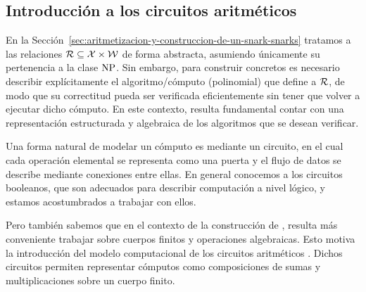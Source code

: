 
\subsection{Introducción a los circuitos aritméticos}
\label{subsec:apendice-b-arithmetic-circuits-introduccion-a-los-circuitos-aritmeticos}

En la Sección~\ref{sec:aritmetizacion-y-construccion-de-un-snark-snarks} tratamos a las relaciones $\mathcal{R} \subseteq \mathcal{X} \times \mathcal{W}$ de forma abstracta, asumiendo únicamente su pertenencia a la clase $\mathrm{NP}$. Sin embargo, para construir \SNARK concretos es necesario describir explícitamente el algoritmo/cómputo (polinomial) que define a $\mathcal{R}$, de modo que su correctitud pueda ser verificada eficientemente sin tener que volver a ejecutar dicho cómputo. En este contexto, resulta fundamental contar con una representación estructurada y algebraica de los algoritmos que se desean verificar.

Una forma natural de modelar un cómputo es mediante un circuito, en el cual cada operación elemental se representa como una puerta y el flujo de datos se describe mediante conexiones entre ellas. En general conocemos a los circuitos booleanos, que son adecuados para describir computación a nivel lógico, y estamos acostumbrados a trabajar con ellos.

Pero también sabemos que en el contexto de la construcción de \SNARK, resulta más conveniente trabajar sobre cuerpos finitos y operaciones algebraicas. Esto motiva la introducción del modelo computacional de los circuitos aritméticos \cite{DBLP:journals/ftsec/Thaler22}. Dichos circuitos permiten representar cómputos como composiciones de sumas y multiplicaciones sobre un cuerpo finito.

